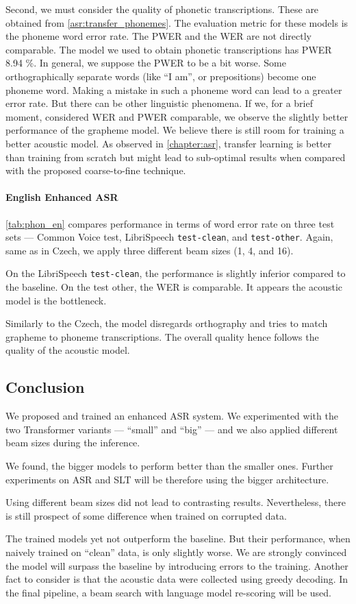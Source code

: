 Second, we must consider the quality of phonetic transcriptions. These are obtained from \cref{asr:transfer_phonemes}. The evaluation metric for these models is the phoneme word error rate. The PWER and the WER are not directly comparable. The model we used to obtain phonetic transcriptions has PWER 8.94 \%. In general, we suppose the PWER to be a bit worse. Some orthographically separate words (like ``I am'', or prepositions) become one phoneme word. Making a mistake in such a phoneme word can lead to a greater error rate. But there can be other linguistic phenomena. If we, for a brief moment, considered WER and PWER comparable, we observe the slightly better performance of the grapheme model. We believe there is still room for training a better acoustic model. As observed in \cref{chapter:asr}, transfer learning is better than training from scratch but might lead to sub-optimal results when compared with the proposed coarse-to-fine technique. 

\paragraph{English Enhanced ASR}
\cref{tab:phon_en} compares performance in terms of word error rate on three test sets --- Common Voice test, LibriSpeech \texttt{test-clean}, and \texttt{test-other}. Again, same as in Czech, we apply three different beam sizes (1, 4, and 16).

On the LibriSpeech \texttt{test-clean}, the performance is slightly inferior compared to the baseline. On the test other, the WER is comparable. It appears the acoustic model is the bottleneck. 

Similarly to the Czech, the model disregards orthography and tries to match grapheme to phoneme transcriptions. The overall quality hence follows the quality of the acoustic model.

\subsection{Conclusion}
\label{easr:conclusion}
We proposed and trained an enhanced ASR system. We experimented with the two Transformer variants --- ``small'' and ``big'' --- and we also applied different beam sizes during the inference. 

We found, the bigger models to perform better than the smaller ones. Further experiments on ASR and SLT will be therefore using the bigger architecture.

Using different beam sizes did not lead to contrasting results. Nevertheless, there is still prospect of some difference when trained on corrupted data.

The trained models yet not outperform the baseline. But their performance, when naively trained on ``clean'' data, is only slightly worse. We are strongly convinced the model will surpass the baseline by introducing errors to the training. Another fact to consider is that the acoustic data were collected using greedy decoding. In the final pipeline, a beam search with language model re-scoring will be used. 

